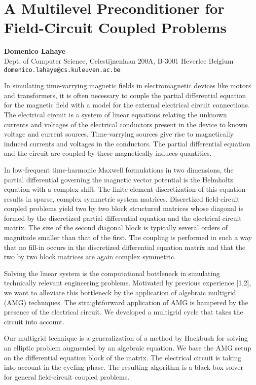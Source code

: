 \documentclass[11pt]{article}
\newcommand{\nextab}[4]{
	\section{#2}
	{\bf #1} \\ \nopagebreak
	{#3} \\ \nopagebreak
	{\tt #4} \nopagebreak
	}
\begin{document}

\nextab
{Domenico Lahaye}
{A Multilevel Preconditioner for Field-Circuit Coupled Problems}
{Dept. of Computer Science, Celestijnenlaan 200A, B-3001 Heverlee Belgium}
{domenico.lahaye@cs.kuleuven.ac.be}


In simulating time-varrying magnetic fields in electromagnetic devices like
motors and transformers, it is often necessary to couple the partial
differential equation for the magnetic field with a model for the external
electrical circuit connections. The electrical circuit is a system of
linear equations relating the unknown currents and voltages of the
electrical conductors present in the device to known voltage and current
sources. Time-varrying sources give rise to magnetically induced currents
and voltages in the conductors. The partial differential equation and the
circuit are coupled by these magnetically induces quantities.



In low-frequent time-harmonic Maxwell formulations in two dimensions,
the partial differential governing the magnetic vector potential is the
Helmholtz equation with a complex shift. The finite element discretization
of this equation results in sparse, complex symmetric system matrices.
Discretized
field-circuit coupled problems yield two by two block structured matrices
whose diagonal is formed by the discretized partial differential equation
and the electrical circuit matrix. The size of the second diagonal block is
typically several orders of magnitude smaller than that of the first. The
coupling is performed in such a way that no fill-in occurs in the
discretized differential equation matrix and that the two by two
block matrices are again complex symmetric.


Solving the linear system is the computational bottleneck in simulating
technically relevant engineering problems. Motivated by previous experience
[1,2],
we want to alleviate this bottleneck by the application of algebraic multigrid
(AMG) techniques. The straightforward application of AMG is hampered by the
presence of the electrical circuit. We developed a multigrid cycle that takes
the circuit into account.


Our multigrid technique is a generalization of a method by Hackbush for
solving an elliptic problem augmented by an algebraic equation. We base the
AMG setup on the differential equation block of the matrix. The electrical
circuit is taking into account in the cycling phase. The resulting algorithm
is a black-box solver for general field-circuit coupled problems.
\end{document}
